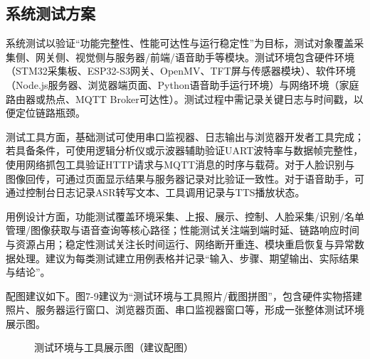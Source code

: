 \subsection{系统测试方案}
\par 系统测试以验证“功能完整性、性能可达性与运行稳定性”为目标，测试对象覆盖采集侧、网关侧、视觉侧与服务器/前端/语音助手等模块。测试环境包含硬件环境（STM32采集板、ESP32-S3网关、OpenMV、TFT屏与传感器模块）、软件环境（Node.js服务器、浏览器端页面、Python语音助手运行环境）与网络环境（家庭路由器或热点、MQTT Broker可达性）。测试过程中需记录关键日志与时间戳，以便定位链路瓶颈。
\par 测试工具方面，基础测试可使用串口监视器、日志输出与浏览器开发者工具完成；若具备条件，可使用逻辑分析仪或示波器辅助验证UART波特率与数据帧完整性，使用网络抓包工具验证HTTP请求与MQTT消息的时序与载荷。对于人脸识别与图像回传，可通过页面显示结果与服务器记录对比验证一致性。对于语音助手，可通过控制台日志记录ASR转写文本、工具调用记录与TTS播放状态。
\par 用例设计方面，功能测试覆盖环境采集、上报、展示、控制、人脸采集/识别/名单管理/图像获取与语音查询等核心路径；性能测试关注端到端时延、链路响应时间与资源占用；稳定性测试关注长时间运行、网络断开重连、模块重启恢复与异常数据处理。建议为每类测试建立用例表格并记录“输入、步骤、期望输出、实际结果与结论”。
\par 配图建议如下。图7-9建议为“测试环境与工具照片/截图拼图”，包含硬件实物搭建照片、服务器运行窗口、浏览器页面、串口监视器窗口等，形成一张整体测试环境展示图。
\begin{figure}[H]
\centering
{}
\caption{测试环境与工具展示图（建议配图）}
\label{fig:test_env}
\end{figure}

